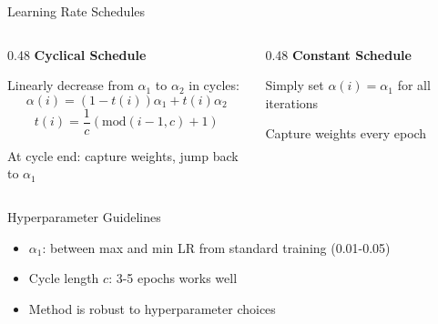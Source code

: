 \documentclass{beamer}
\begin{document}
\begin{frame}{Learning Rate Schedules}

\begin{columns}[T]
\begin{column}{0.48\textwidth}
\textbf{Cyclical Schedule}

Linearly decrease from $\alpha_1$ to $\alpha_2$ in cycles:
\begin{equation*}
\alpha(i) = (1 - t(i))\alpha_1 + t(i)\alpha_2
\end{equation*}
\begin{equation*}
t(i) = \frac{1}{c}(\text{mod}(i-1, c) + 1)
\end{equation*}

\vspace{0.2cm}
\small
At cycle end: capture weights, jump back to $\alpha_1$
\normalsize
\end{column}

\begin{column}{0.48\textwidth}
\textbf{Constant Schedule}

Simply set $\alpha(i) = \alpha_1$ for all iterations

\vspace{0.2cm}
\small
Capture weights every epoch
\normalsize
\end{column}
\end{columns}

\vspace{0.5cm}

\begin{block}{Hyperparameter Guidelines}
\begin{itemize}
    \item $\alpha_1$: between max and min LR from standard training (0.01-0.05)
    \item Cycle length $c$: 3-5 epochs works well
    \item Method is robust to hyperparameter choices
\end{itemize}
\end{block}

\end{frame}
\end{document}
